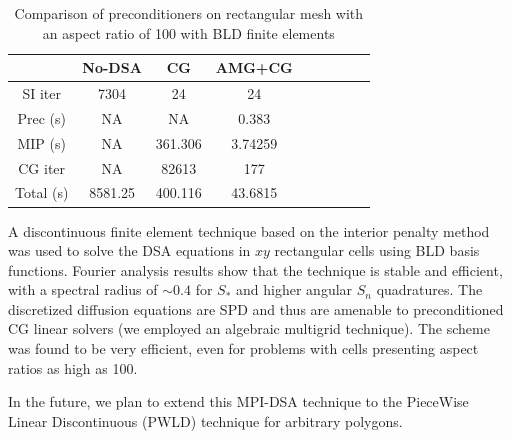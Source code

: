 \documentclass{mc2013}
\renewcommand{\(}{\left(}
\renewcommand{\)}{\right)}
\renewcommand{\[}{\left[}
\renewcommand{\]}{\right]}
\newcommand{\sn}{\ensuremath{S_n}\xspace}
\begin{document}
    \begin{table}[H]
\centering
    \caption{Comparison of preconditioners on rectangular mesh with an aspect ratio of 100 with BLD finite elements}  
      \begin{tabular}{|c|c|c|c|c|c|c|c|c|}
        \hline
        & No-DSA & CG & AMG+CG \\
        \hline
        SI iter    & 7304    & 24      & 24      \\
        Prec (s)   & NA      & NA      & 0.383   \\
        MIP (s)    & NA      & 361.306 & 3.74259 \\
        CG iter    & NA      & 82613   & 177     \\
        Total (s)  & 8581.25 & 400.116 & 43.6815 \\
        \hline
      \end{tabular}
      \label{bld_ar_100}      
    \end{table}
 \label{sec:ccl}

A discontinuous finite element technique based on the interior penalty method was used to
solve the DSA equations in $xy$ rectangular cells using BLD basis functions. 
Fourier analysis results show that the technique is stable and efficient, with a spectral
radius of $\sim 0.4$ for $S_*$ and higher angular \sn quadratures. The discretized diffusion 
equations are SPD and thus are amenable to preconditioned CG linear solvers (we employed an
algebraic multigrid technique). The scheme was found to be very efficient, even for problems 
with cells presenting aspect ratios as high as 100.

In the future, we plan to extend this MPI-DSA technique to the PieceWise Linear Discontinuous (PWLD) technique
for arbitrary polygons. 
 \label{sec:app}
\end{document}
